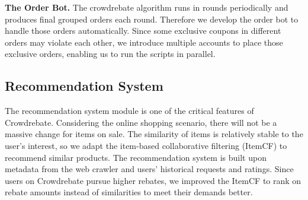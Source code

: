 \textbf{The Order Bot.} The crowdrebate algorithm runs in rounds periodically and produces final grouped orders each round. Therefore we develop the order bot to handle those orders automatically. Since some exclusive coupons in different orders may violate each other, we introduce multiple accounts to place those exclusive orders, enabling us to run the scripts in parallel.

\subsection{Recommendation System}

The recommendation system module is one of the critical features of Crowdrebate. Considering the online shopping scenario, there will not be a massive change for items on sale. The similarity of items is relatively stable to the user’s interest, so we adapt the item-based collaborative filtering (ItemCF) to recommend similar products. The recommendation system is built upon metadata from the web crawler and users’ historical requests and ratings. Since users on Crowdrebate pursue higher rebates, we improved the ItemCF to rank on rebate amounts instead of similarities to meet their demands better. 